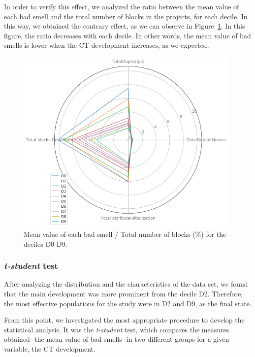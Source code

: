 In order to verify this effect, we analyzed the ratio between the mean value of each bad smell and the total number of blocks in the projects, for each decile. In this way, we obtained the contrary effect, as we can observe in Figure~\ref{fig:ratio_bad_smells_deciles}. In this figure, the ratio decreases with each decile. In other words, the mean value of bad smells is lower when the CT development increases, as we expected. 

\begin{figure}
    \centering
    \includegraphics[width=11cm,                         keepaspectratio]{img/ratio_bad_smells_deciles.png}
    \caption{Mean value of each bad smell / Total number of blocks (\%) for the deciles D0-D9.}
    \label{fig:ratio_bad_smells_deciles}
\end{figure}

\subsubsection{\textit{t-student} test}
\label{subsubsec:test_tstudent}

After analyzing the distribution and the characteristics of the data set, we found that the main development was more prominent from the decile D2. Therefore, the most effective populations for the study were in D2 and D9, as the final state. 

From this point, we investigated the most appropriate procedure to develop the statistical analysis. It was the \textit{t-student} test, which compares the measures obtained -the mean value of bad smells- in two different groups for a given variable, the CT development.

